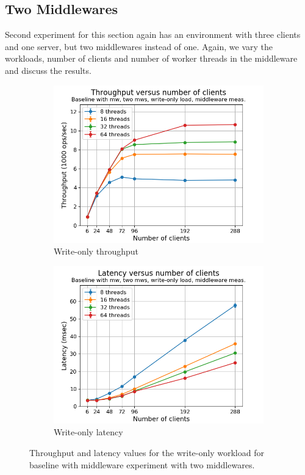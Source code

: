 \documentclass[11pt,a4paper]{article}
\begin{document}
\subsection{Two Middlewares} \label{sec:mwb2}
Second experiment for this section again has an environment with three clients and one server, but two middlewares instead of one. Again, we vary the workloads, number of clients and number of worker threads in the middleware and discuss the results.


\begin{figure}[h]
\centering
\begin{subfigure}{.5\textwidth}
  \centering
  \includegraphics[width=1.0\linewidth,trim={5px 0px 20px 0px},clip]{img/plot/mwb2-wo-tp_mw.png}
  \caption{Write-only throughput}
  \label{fig:mwb2-wo-tp_mw}
\end{subfigure}%
\begin{subfigure}{.5\textwidth}
  \centering
  \includegraphics[width=1.0\linewidth,trim={5px 0px 20px 0px},clip]{img/plot/mwb2-wo-lat_mw}
  \caption{Write-only latency}
  \label{fig:mwb2-wo-lat_mw}
\end{subfigure}
\caption{Throughput and latency values for the write-only workload for baseline with middleware experiment with two middlewares.}
\label{fig:mwb2-wo_mw}
\end{figure}
\end{document}
